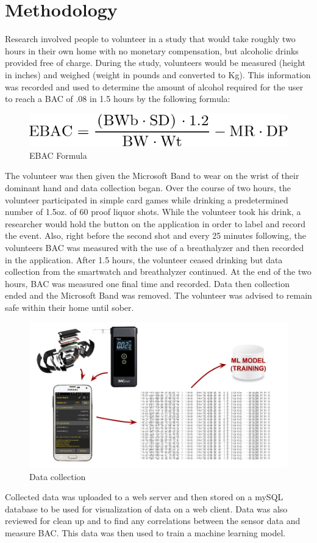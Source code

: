 \section{Methodology}
Research involved people to volunteer in a study that would take roughly two hours in their own home with no monetary compensation, but alcoholic drinks provided free of charge. During the study, volunteers would be measured (height in inches) and weighed (weight in pounds and converted to Kg). This information was recorded and used to determine the amount of alcohol required for the user to reach a BAC of .08 in 1.5 hours by the following formula:

\begin{figure}[H]
	\centering
	\includegraphics[scale=.40]{../figs/formula.png}
	\caption{EBAC Formula}
\end{figure}

The volunteer was then given the Microsoft Band to wear on the wrist of their dominant hand and data collection began. Over the course of two hours, the volunteer participated in simple card games while drinking a predetermined number of 1.5oz. of 60 proof liquor shots. While the volunteer took his drink, a researcher would hold the button on the application in order to label and record the event. Also, right before the second shot and every 25 minutes following, the volunteers BAC was measured with the use of a breathalyzer and then recorded in the application. After 1.5 hours, the volunteer ceased drinking but data collection from the smartwatch and breathalyzer continued. At the end of the two hours, BAC was measured one final time and recorded. Data then collection ended and the Microsoft Band was removed. The volunteer was advised to remain safe within their home until sober. 

\begin{figure}[H]
	\centering
	\includegraphics[scale=.28]{../figs/datacollectionprocess.png}
	\caption{Data collection}
\end{figure}

Collected data was uploaded to a web server and then stored on a mySQL database to be used for visualization of data on a web client. Data was also reviewed for clean up and to find any correlations between the sensor data and measure BAC. This data was then used to train a machine learning model. 